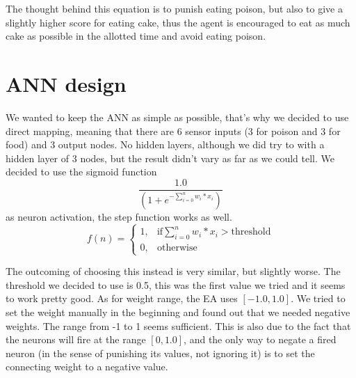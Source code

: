 \documentclass[12pt, a4paper]{article}
\begin{document}
The thought behind this equation is to punish eating poison, but also to give a slightly higher score for eating cake, thus the agent is encouraged to eat as much cake as possible in the allotted time and avoid eating poison. 

\section{ANN design}
We wanted to keep the ANN as simple as possible, that's why we decided to use direct mapping, meaning that there are 6 sensor inputs (3 for poison and 3 for food) and 3 output nodes. No hidden layers, although we did try to with a hidden layer of 3 nodes, but the result didn't vary as far as we could tell.
We decided to use the sigmoid function $$ \frac{1.0}
{(1+e^ {-\sum_{i = 0}^{n}{w_i * x_i}})} $$
as neuron activation, the step function works as well.  
$$
f(n) =
\begin{cases}
1, & \text{if} \sum_{i = 0}^{n}{w_i * x_i}>\text{threshold} \\
0, & \text{otherwise }
\end{cases}
$$

The outcoming of choosing this instead is very similar, but slightly worse.
The threshold we decided to use is 0.5, this was the first value we tried and it seems to work pretty good. As for weight range, the EA uses $[-1.0, 1.0]$. We tried to set the weight manually in the beginning and found out that we needed negative weights. The range from -1 to 1 seems sufficient. This is also due to the fact that the neurons will fire at the range $[0,1.0]$, and the only way to negate a fired neuron (in the sense of punishing its values, not ignoring it) is to set the connecting weight to a negative value.
\end{document}
